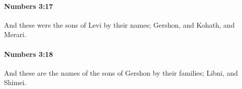 		\paragraph{Numbers 3:17} %
			\label{NUMBERS-3-17}

			And these were the sons of Levi by their names; Gershon, and Kohath, and Merari.


		\paragraph{Numbers 3:18} %
			\label{NUMBERS-3-18}

			And these are the names of the sons of Gershon by their families; Libni, and Shimei.


